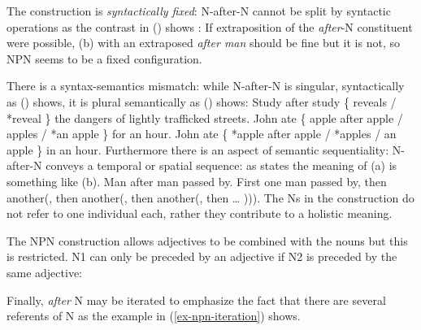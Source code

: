 \documentclass[output=paper]{langsci/langscibook}
\begin{document}
\eal
\settowidth{}
\zl

The construction is \emph{syntactically fixed}: N-after-N cannot be split by syntactic operations as the
contrast in () shows \citep{Matsuyama2004a}:
\eal
{}
\zl
If extraposition of the \emph{after}-N constituent were possible, (b) with an extraposed
\emph{after man} should be fine but it is not, so NPN seems to be a fixed configuration.

There is a syntax-semantics mismatch:
while N-after-N is singular, syntactically as () shows, it is plural semantically as
() shows:
\ea
Study after study \{ reveals / *reveal \} the dangers of lightly trafficked streets.
\z
\eal
\ex John ate \{ apple after apple / apples / *an apple \} for an hour. 
\ex John ate \{ *apple after apple / *apples / an apple \} in an hour.
\zl
Furthermore there is an aspect of semantic sequentiality: N-after-N conveys a temporal or spatial
sequence: as \citet{Bargmann2015a} states the meaning of (a) is something like (b).
\eal
\ex Man after man passed by. 
\ex First one man passed by, then another(, then another(, then another(, then  \ldots{} ))). 
\zl
The Ns in the construction do not refer to one individual each, rather they contribute to a holistic meaning.

The NPN construction allows adjectives to be combined with the nouns but this is restricted.
N1 can only be preceded by an adjective if N2 is preceded by the same adjective: 
\eal
{}
\zl

Finally, \emph{after} N may be iterated to emphasize the fact that there are several referents of N as the example in (\ref{ex-npn-iteration}) shows. 
\end{document}
